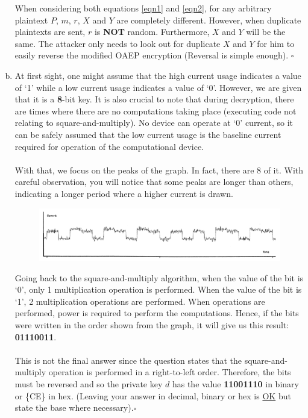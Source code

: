 \documentclass[12pt]{article}
\begin{document}
\begin{enumerate}[(a)]
When considering both equations \eqref{eqn1} and \eqref{eqn2}, for any arbitrary plaintext $P$, $m$, $r$, $X$ and $Y$ are completely different. However, when duplicate plaintexts are sent, $r$ is \textbf{NOT} random. Furthermore, $X$ and $Y$ will be the same. The attacker only needs to look out for duplicate $X$ and $Y$ for him to easily reverse the modified OAEP encryption (Reversal is simple enough). \hfill $\square$
\item At first sight, one might assume that the high current usage indicates a value of `1' while a low current usage indicates a value of `0'. However, we are given that it is a \textbf{8}-bit key. It is also crucial to note that during decryption, there are times where there are no computations taking place (executing code not relating to square-and-multiply). No device can operate at `0' current, so it can be safely assumed that the low current usage is the baseline current required for operation of the computational device.\\\\With that, we focus on the peaks of the graph. In fact, there are 8 of it. With careful observation, you will notice that some peaks are longer than others, indicating a longer period where a higher current is drawn.
\begin{figure}[H]
\centering
\includegraphics[width=1\linewidth]{Capture}
\label{fig:capture2}
\end{figure}
Going back to the square-and-multiply algorithm, when the value of the bit is `0', only 1 multiplication operation is performed. When the value of the bit is `1', 2 multiplication operations are performed. When operations are performed, power is required to perform the computations. Hence, if the bits were written in the order shown from the graph, it will give us this result: \textbf{01110011}.\\\\This is not the final answer since the question states that the square-and-multiply operation is performed in a right-to-left order. Therefore, the bits must be reversed and so the private key $d$ has the value \textbf{11001110} in binary or \{CE\} in hex. (Leaving your answer in decimal, binary or hex is \underline{OK} but state the base where necessary).\hfill $\square$
\end{enumerate}
\end{document}
